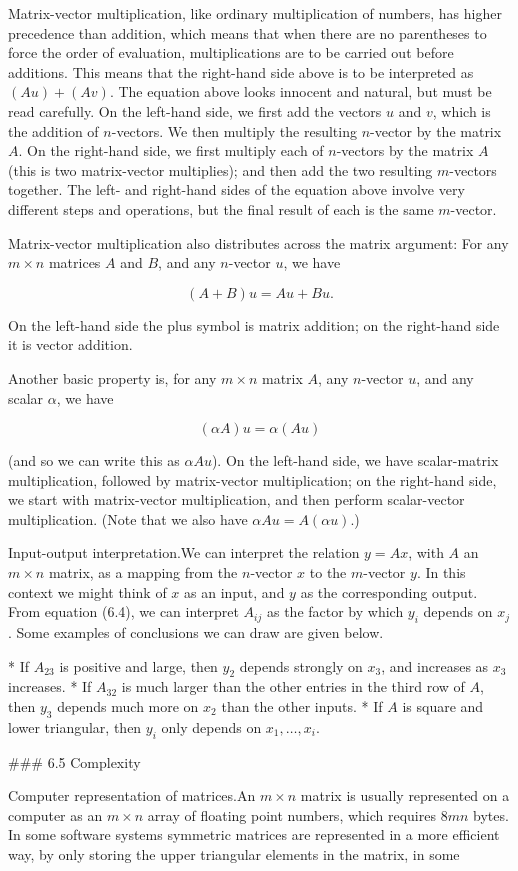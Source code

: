 Matrix-vector multiplication, like ordinary multiplication of numbers, has higher precedence than addition, which means that when there are no parentheses to force the order of evaluation, multiplications are to be carried out before additions. This means that the right-hand side above is to be interpreted as \((Au)+(Av)\). The equation above looks innocent and natural, but must be read carefully. On the left-hand side, we first add the vectors \(u\) and \(v\), which is the addition of \(n\)-vectors. We then multiply the resulting \(n\)-vector by the matrix \(A\). On the right-hand side, we first multiply each of \(n\)-vectors by the matrix \(A\) (this is two matrix-vector multiplies); and then add the two resulting \(m\)-vectors together. The left- and right-hand sides of the equation above involve very different steps and operations, but the final result of each is the same \(m\)-vector.

Matrix-vector multiplication also distributes across the matrix argument: For any \(m\times n\) matrices \(A\) and \(B\), and any \(n\)-vector \(u\), we have

\[(A+B)u=Au+Bu.\]

On the left-hand side the plus symbol is matrix addition; on the right-hand side it is vector addition.

Another basic property is, for any \(m\times n\) matrix \(A\), any \(n\)-vector \(u\), and any scalar \(\alpha\), we have

\[(\alpha A)u=\alpha(Au)\]

(and so we can write this as \(\alpha Au\)). On the left-hand side, we have scalar-matrix multiplication, followed by matrix-vector multiplication; on the right-hand side, we start with matrix-vector multiplication, and then perform scalar-vector multiplication. (Note that we also have \(\alpha Au=A(\alpha u)\).)

Input-output interpretation.We can interpret the relation \(y=Ax\), with \(A\) an \(m\times n\) matrix, as a mapping from the \(n\)-vector \(x\) to the \(m\)-vector \(y\). In this context we might think of \(x\) as an input, and \(y\) as the corresponding output. From equation (6.4), we can interpret \(A_{ij}\) as the factor by which \(y_{i}\) depends on \(x_{j}\). Some examples of conclusions we can draw are given below.

* If \(A_{23}\) is positive and large, then \(y_{2}\) depends strongly on \(x_{3}\), and increases as \(x_{3}\) increases.
* If \(A_{32}\) is much larger than the other entries in the third row of \(A\), then \(y_{3}\) depends much more on \(x_{2}\) than the other inputs.
* If \(A\) is square and lower triangular, then \(y_{i}\) only depends on \(x_{1},\ldots,x_{i}\).

### 6.5 Complexity

Computer representation of matrices.An \(m\times n\) matrix is usually represented on a computer as an \(m\times n\) array of floating point numbers, which requires \(8mn\) bytes. In some software systems symmetric matrices are represented in a more efficient way, by only storing the upper triangular elements in the matrix, in some 